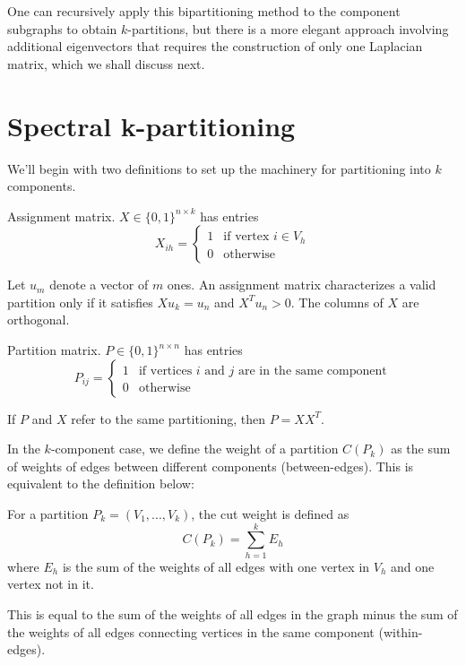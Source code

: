 One can recursively apply this bipartitioning method to the component
subgraphs to obtain $k$-partitions, but there is a more elegant
approach involving additional eigenvectors that requires the
construction of only one Laplacian matrix, which we shall discuss next.

\section{Spectral k-partitioning}

We'll begin with two definitions to set up the machinery for
partitioning into $k$ components.

\begin{definition}
Assignment matrix. $X \in \{0, 1\}^{n \times k}$ has entries
\[ X_{ih} = \begin{cases}
		1 & \mbox{if vertex } i \in V_h \\
		0 & \mbox{otherwise}
\end{cases} \]
\end{definition}

Let $u_m$ denote a vector of $m$ ones.
An assignment matrix characterizes a valid partition only if it
satisfies $X u_k = u_n$ and $X^T u_n > 0$.
The columns of $X$ are orthogonal.

\begin{definition}
Partition matrix. $P \in \{0, 1\}^{n \times n}$ has entries
\[ P_{ij} = \begin{cases}
		1 & \mbox{if vertices } i \mbox{ and } j
		    \mbox{ are in the same component} \\
		0 & \mbox{otherwise}
\end{cases} \]
\end{definition}

If $P$ and $X$ refer to the same partitioning, then $P = X X^T$.

In the $k$-component case, we define the weight of a partition
$C(P_k)$ as the sum of weights of edges between different components
(between-edges). This is equivalent to the definition below:

\begin{definition}
 For a partition $P_k = (V_1, ..., V_k)$, the cut weight
is defined as
\[ C(P_k) = \sum_{h=1}^k E_h \]
where $E_h$ is the sum of the weights of all edges with one vertex in
$V_h$ and one vertex not in it.
\end{definition}

This is equal to the sum of the weights of all edges in the graph minus
the sum of the weights of all edges connecting vertices in the same
component (within-edges).


